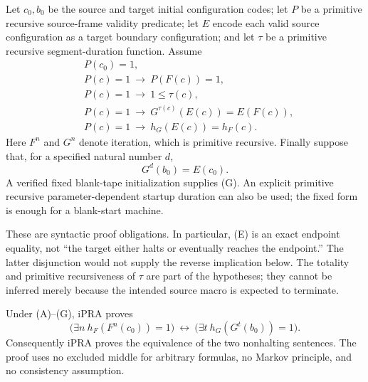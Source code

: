 Let $c_0,b_0$ be the source and target initial configuration codes; let $P$
be a primitive recursive source-frame validity predicate; let $E$ encode
each valid source configuration as a target boundary configuration; and
let $\tau$ be a primitive recursive segment-duration function. Assume
\begin{align}
 &P(c_0)=1,                                                 \tag{B}\label{eq:sim-initial}\\
 &P(c)=1\ \longrightarrow\ P(F(c))=1,                       \tag{C}\label{eq:sim-closed}\\
 &P(c)=1\ \longrightarrow\ 1\leq\tau(c),                 \tag{D}\label{eq:sim-positive}\\
 &P(c)=1\ \longrightarrow\ G^{\tau(c)}(E(c))=E(F(c)),     \tag{E}\label{eq:sim-exact}\\
 &P(c)=1\ \longrightarrow\ h_G(E(c))=h_F(c).              \tag{F}\label{eq:sim-halt}
\end{align}
Here $F^n$ and $G^n$ denote iteration, which is primitive recursive.
Finally suppose that, for a specified natural number $d$,
\[
 G^d(b_0)=E(c_0).                                          \tag{G}\label{eq:sim-startup}
\]
A verified fixed blank-tape initialization supplies (G). An explicit
primitive recursive parameter-dependent startup duration can also be
used; the fixed form is enough for a blank-start machine.

These are syntactic proof obligations. In particular, (E) is an exact
endpoint equality, not ``the target either halts or eventually reaches
the endpoint.'' The latter disjunction would not supply the reverse
implication below. The totality and primitive recursiveness of $\tau$ are
part of the hypotheses; they cannot be inferred merely because the
intended source macro is expected to terminate.

\begin{theorem}
Under (A)--(G), $\mathrm{iPRA}$ proves
\[
 \bigl(\exists n\ h_F(F^n(c_0))=1\bigr)
 \ \longleftrightarrow\
 \bigl(\exists t\ h_G(G^t(b_0))=1\bigr).
\]
Consequently $\mathrm{iPRA}$ proves the equivalence of the two
nonhalting sentences. The proof uses no excluded middle for arbitrary
formulas, no Markov principle, and no consistency assumption.
\end{theorem}

